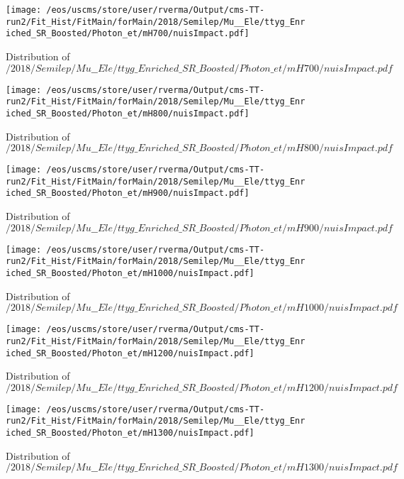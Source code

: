 \begin{figure}
\centering
\texttt{[image: /eos/uscms/store/user/rverma/Output/cms-TT-run2/Fit\_Hist/FitMain/forMain/2018/Semilep/Mu\_\_Ele/ttyg\_Enriched\_SR\_Boosted/Photon\_et/mH700/nuisImpact.pdf]}
\caption{Distribution of $/2018/Semilep/Mu\_\_Ele/ttyg\_Enriched\_SR\_Boosted/Photon\_et/mH700/nuisImpact.pdf$}
\end{figure}

\begin{figure}
\centering
\texttt{[image: /eos/uscms/store/user/rverma/Output/cms-TT-run2/Fit\_Hist/FitMain/forMain/2018/Semilep/Mu\_\_Ele/ttyg\_Enriched\_SR\_Boosted/Photon\_et/mH800/nuisImpact.pdf]}
\caption{Distribution of $/2018/Semilep/Mu\_\_Ele/ttyg\_Enriched\_SR\_Boosted/Photon\_et/mH800/nuisImpact.pdf$}
\end{figure}

\begin{figure}
\centering
\texttt{[image: /eos/uscms/store/user/rverma/Output/cms-TT-run2/Fit\_Hist/FitMain/forMain/2018/Semilep/Mu\_\_Ele/ttyg\_Enriched\_SR\_Boosted/Photon\_et/mH900/nuisImpact.pdf]}
\caption{Distribution of $/2018/Semilep/Mu\_\_Ele/ttyg\_Enriched\_SR\_Boosted/Photon\_et/mH900/nuisImpact.pdf$}
\end{figure}

\begin{figure}
\centering
\texttt{[image: /eos/uscms/store/user/rverma/Output/cms-TT-run2/Fit\_Hist/FitMain/forMain/2018/Semilep/Mu\_\_Ele/ttyg\_Enriched\_SR\_Boosted/Photon\_et/mH1000/nuisImpact.pdf]}
\caption{Distribution of $/2018/Semilep/Mu\_\_Ele/ttyg\_Enriched\_SR\_Boosted/Photon\_et/mH1000/nuisImpact.pdf$}
\end{figure}

\begin{figure}
\centering
\texttt{[image: /eos/uscms/store/user/rverma/Output/cms-TT-run2/Fit\_Hist/FitMain/forMain/2018/Semilep/Mu\_\_Ele/ttyg\_Enriched\_SR\_Boosted/Photon\_et/mH1200/nuisImpact.pdf]}
\caption{Distribution of $/2018/Semilep/Mu\_\_Ele/ttyg\_Enriched\_SR\_Boosted/Photon\_et/mH1200/nuisImpact.pdf$}
\end{figure}

\begin{figure}
\centering
\texttt{[image: /eos/uscms/store/user/rverma/Output/cms-TT-run2/Fit\_Hist/FitMain/forMain/2018/Semilep/Mu\_\_Ele/ttyg\_Enriched\_SR\_Boosted/Photon\_et/mH1300/nuisImpact.pdf]}
\caption{Distribution of $/2018/Semilep/Mu\_\_Ele/ttyg\_Enriched\_SR\_Boosted/Photon\_et/mH1300/nuisImpact.pdf$}
\end{figure}

